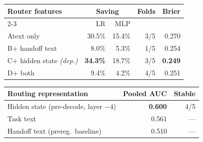 %
%
\begin{tabular}{@{}lrrrr@{}}
\toprule
Router features & \multicolumn{2}{c}{Saving} & Folds & Brier \\
\cmidrule(lr){2-3}
 & LR & MLP & & \\
\midrule
A\quad text only                   & 30.5\% & 15.4\% & 3/5 & 0.270 \\
B\quad $+$ handoff text            & \phantom{0}8.0\% & \phantom{0}5.3\% & 1/5 & 0.254 \\
C\quad $+$ hidden state \emph{(dep.)} & \textbf{34.3\%} & 18.7\% & 3/5 & \textbf{0.249} \\
D\quad $+$ both                    & \phantom{0}9.4\% & \phantom{0}4.2\% & 4/5 & 0.251 \\
\bottomrule
\end{tabular}

\vspace{4pt}

\begin{tabular}{@{}lrr@{}}
\toprule
Routing representation & Pooled AUC & Stable \\
\midrule
Hidden state (pre-decode, layer $-4$) & \textbf{0.600} & 4/5 \\
Task text                             & 0.561 & --- \\
Handoff text (prereg.\ baseline)      & 0.510 & --- \\
\bottomrule
\end{tabular}
